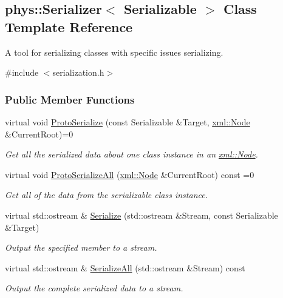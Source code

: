 \hypertarget{classphys_1_1Serializer}{
\subsection{phys::Serializer$<$ Serializable $>$ Class Template Reference}
\label{classphys_1_1Serializer}
}


A tool for serializing classes with specific issues serializing.  




{\ttfamily \#include $<$serialization.h$>$}

\subsubsection*{Public Member Functions}
\begin{DoxyCompactItemize}
\item 
virtual void \hyperlink{classphys_1_1Serializer_a337a685f966e6d06bfb382905b29db5a}{ProtoSerialize} (const Serializable \&Target, \hyperlink{classphys_1_1xml_1_1Node}{xml::Node} \&CurrentRoot)=0
\begin{DoxyCompactList}\small\item\em Get all the serialized data about one class instance in an \hyperlink{classphys_1_1xml_1_1Node}{xml::Node}. \item\end{DoxyCompactList}\item 
virtual void \hyperlink{classphys_1_1Serializer_abb5e6f46de9edbf72a7b3e88e955bd69}{ProtoSerializeAll} (\hyperlink{classphys_1_1xml_1_1Node}{xml::Node} \&CurrentRoot) const =0
\begin{DoxyCompactList}\small\item\em Get all of the data from the serializable class instance. \item\end{DoxyCompactList}\item 
virtual std::ostream \& \hyperlink{classphys_1_1Serializer_a013ef8c6c9be4d9d3e85488e039b9772}{Serialize} (std::ostream \&Stream, const Serializable \&Target)
\begin{DoxyCompactList}\small\item\em Output the specified member to a stream. \item\end{DoxyCompactList}\item 
virtual std::ostream \& \hyperlink{classphys_1_1Serializer_a45fe456179603bb2f19a978d135439a1}{SerializeAll} (std::ostream \&Stream) const 
\begin{DoxyCompactList}\small\item\em Output the complete serialized data to a stream. \item\end{DoxyCompactList}\end{DoxyCompactItemize}


